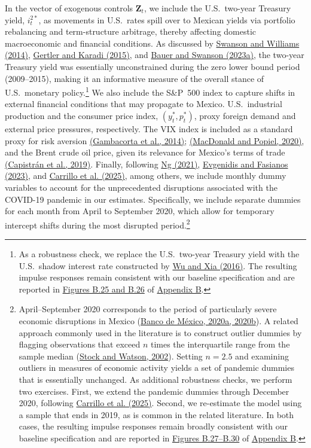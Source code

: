 \documentclass[\latexroot/\projectname]{subfiles}
\begin{document}


In the vector of exogenous controls $\boldsymbol{Z}_t$, we include the U.S.\ two-year Treasury yield, $i_t^{2*}$, as movements in U.S.\ rates spill over to Mexican yields via portfolio rebalancing and term-structure arbitrage, thereby affecting domestic macroeconomic and financial conditions. As discussed by \hyperlink{Swanson and Williams (2014)}{Swanson and Williams (2014)}, \hyperlink{Gertler and Karadi (2015)}{Gertler and Karadi (2015)}, and \hyperlink{Bauer and Swanson (2023a)}{Bauer and Swanson (2023a)}, the two-year Treasury yield was essentially unconstrained during the zero lower bound period (2009--2015), making it an informative measure of the overall stance of U.S.\ monetary policy.\footnote{As a robustness check, we replace the U.S.\ two-year Treasury yield with the U.S.\ shadow interest rate constructed by \hyperlink{Wu and Xia (2016)}{Wu and Xia (2016)}. The resulting impulse responses remain consistent with our baseline specification and are reported in \hyperlink{Figure B.25}{Figures B.25 and B.26} of \hyperlink{Appendix B}{Appendix B}.} We also include the S\&P~500 index to capture shifts in external financial conditions that may propagate to Mexico. U.S.\ industrial production and the consumer price index, $(y_t^*, p_t^*)$, proxy foreign demand and external price pressures, respectively. The VIX index is included as a standard proxy for risk aversion \hyperlink{Gambacorta et al. (2014)}{(Gambacorta et al., 2014)}; \hyperlink{MacDonald and Popiel (2020)}{(MacDonald and Popiel, 2020)}, and the Brent crude oil price, given its relevance for Mexico's terms of trade \hyperlink{Capistrán et al. (2019)}{(Capistrán et al., 2019)}. Finally, following \hyperlink{Ng (2021)}{Ng (2021)}, \hyperlink{Evgenidis and Fasianos (2023)}{Evgenidis and Fasianos (2023)}, and \hyperlink{Carrillo et al. (2025)}{Carrillo et al. (2025)}, among others, we include monthly dummy variables to account for the unprecedented disruptions associated with the COVID-19 pandemic in our estimates. Specifically, we include separate dummies for each month from April to September 2020, which allow for temporary intercept shifts during the most disrupted period.\footnote{April--September 2020 corresponds to the period of particularly severe economic disruptions in Mexico (\hyperlink{Banco de Mexico (2020)}{Banco de México, 2020a, 2020b}). A related approach commonly used in the literature is to construct outlier dummies by flagging observations that exceed $n$ times the interquartile range from the sample median (\hyperlink{Stock and Watson (2002)}{Stock and Watson, 2002}). Setting $n=2.5$ and examining outliers in measures of economic activity yields a set of pandemic dummies that is essentially unchanged. As additional robustness checks, we perform two exercises. First, we extend the pandemic dummies through December 2020, following \hyperlink{Carrillo et al. (2025)}{Carrillo et al. (2025)}. Second, we re-estimate the model using a sample that ends in 2019, as is common in the related literature. In both cases, the resulting impulse responses remain broadly consistent with our baseline specification and are reported in \hyperlink{Figure B.19}{Figures B.27--B.30} of \hyperlink{Appendix B}{Appendix B}.}
\end{document}
